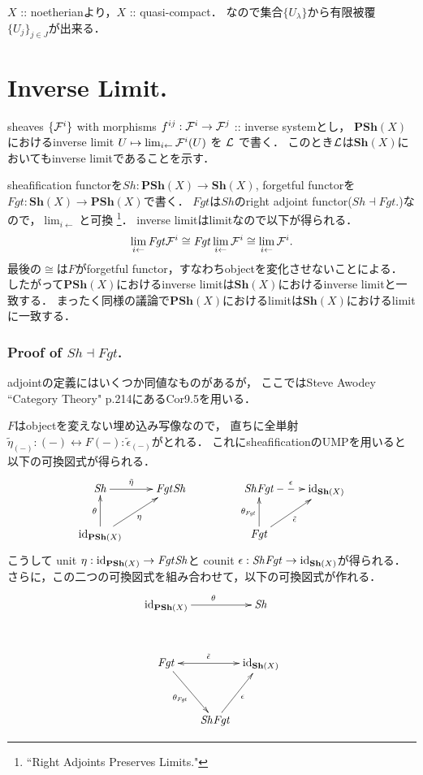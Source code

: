 \documentclass[a4paper]{jsarticle}
\newcommand{\Sh}{\mathbf{Sh}}
\newcommand{\PSh}{\mathbf{PSh}}
\newcommand{\ftorSh}{\mathit{Sh}}
\newcommand{\ftorFgt}{\mathit{Fgt}}
\begin{document}
    $X$ :: noetherianより，$X$ :: quasi-compact．
    なので集合$\{U_{\lambda}\}$から有限被覆$\{ U_j \}_{j \in J}$が出来る．

\section{Inverse Limit.} %
    sheaves $\{\mathcal{F}^i\}$ with morphisms $f^{ij}: \mathcal{F}^i \to \mathcal{F}^j$ :: inverse systemとし，
    $\PSh(X)$におけるinverse limit $U \mapsto \lim_{i \leftarrow} \mathcal{F}^i(U)$ を $\mathcal{L}$ で書く．
    このとき$\mathcal{L}$は$\Sh(X)$においてもinverse limitであることを示す．
    
    sheafification functorを$\ftorSh: \PSh(X) \to \Sh(X)$, 
    forgetful functorを$\ftorFgt: \Sh(X) \to \PSh(X)$で書く．
    $\ftorFgt$は$\ftorSh$のright adjoint functor($\ftorSh \dashv \ftorFgt$.)なので，$\lim_{i \leftarrow}$と可換
    \footnote{``Right Adjoints Preserves Limits."}．
    inverse limitはlimitなので以下が得られる．
    \[ \lim_{i \leftarrow} \ftorFgt \shF^i \cong \ftorFgt \lim_{i \leftarrow} \shF^i \cong \lim_{i \leftarrow} \shF^i. \]
    最後の$\cong$は$F$がforgetful functor，すなわちobjectを変化させないことによる．
    したがって$\PSh(X)$におけるinverse limitは$\Sh(X)$におけるinverse limitと一致する．
    まったく同様の議論で$\PSh(X)$におけるlimitは$\Sh(X)$におけるlimitに一致する．

    \subsubsection{Proof of $\ftorSh \dashv \ftorFgt$.}
    adjointの定義にはいくつか同値なものがあるが，
    ここではSteve Awodey ``Category Theory" p.214にあるCor9.5を用いる．

    $F$はobjectを変えない埋め込み写像なので，
    直ちに全単射$\tilde{\eta}_{(-)}: (-) \leftrightarrow F(-):\tilde{\epsilon}_{(-)}$がとれる．
    これにsheafificationのUMPを用いると以下の可換図式が得られる．
    \[
    \xymatrix
    {
    \ftorSh \ar@{->}[r]^-{\tilde{\eta}_{}}& \ftorFgt \ftorSh\\
    \id{\PSh(X)} \ar[ru]_-{\eta} \ar[u]^-{\theta}& {}
    }
    \hspace{15mm}
    \xymatrix
    {
    \ftorSh \ftorFgt \ar@{-->}[r]^-{\epsilon_{}}& \id{\Sh(X)}\\
    \ftorFgt \ar[ru]_-{\tilde{\epsilon}_{}} \ar[u]^-{\theta_{\ftorFgt}}& {}
    }
    \]
    こうして
    unit $\eta: \id{\PSh(X)} \to \ftorFgt \ftorSh$と
    counit $\epsilon: \ftorSh \ftorFgt \to \id{\Sh(X)}$が得られる．
    さらに，この二つの可換図式を組み合わせて，以下の可換図式が作れる．
    \[
    \xymatrix@C=5pt@R=35pt
    {
    \id{\PSh(X)} \ar[rr]^{\theta_{}} & {} & \ftorSh  \\
    \ftorFgt \ar@{<->}[rr]^-{\tilde{\epsilon}_{}} \ar[rd]_-{\theta_{\ftorFgt}} & {} & \id{\Sh(X)} \\
    {} & \ftorSh \ftorFgt \ar[ru]_-{\epsilon_{}} & {}
    }
    \]
\end{document}
